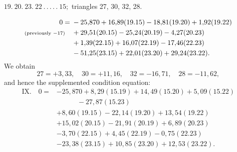 \par\bigskip
\begin{center}
$19.\ 20.\ 23.\ 22\ .\,.\,.\,.\,.\ 15;$ triangles 27, 30, 32, 28.
\end{center}
\[
\begin{aligned}
0={}&-25{,}870+16{,}89(19.15)-18{,}81(19.20)+1{,}92(19.22)\\
\text{\scriptsize(previously $-17$)}\quad&+29{,}51(20.15)-25{,}24(20.19)-4{,}27(20.23)\\
&+1{,}39(22.15)+16{,}07(22.19)-17{,}46(22.23)\\
&-51{,}25(23.15)+22{,}01(23.20)+29{,}24(23.22).
\end{aligned}
\]
We obtain
\[
27=+3{,}33,\quad30=+11{,}16,\quad32=-16{,}71,\quad28=-11{,}62,
\]
and hence the supplemented condition equation:
\[
\begin{aligned}
\mathrm{IX.}\quad0={}&-25{,}870+8{,}29(15.19)+14{,}49(15.20)+5{,}09(15.22)\\
&\qquad\quad-27{,}87(15.23)\\
&+8{,}60(19.15)-22{,}14(19.20)+13{,}54(19.22)\\
&+15{,}02(20.15)-21{,}91(20.19)+6{,}89(20.23)\\
&-3{,}70(22.15)+4{,}45(22.19)-0{,}75(22.23)\\
&-23{,}38(23.15)+10{,}85(23.20)+12{,}53(23.22).
\end{aligned}
\]
